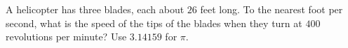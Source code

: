 A helicopter has three blades, each about $26$ feet long. To the nearest foot per second, what is the speed of the tips of the blades when they turn at $400$ revolutions per minute? Use $3.14159$ for $\pi$.
